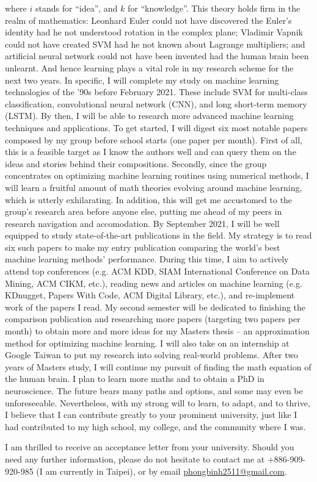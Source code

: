\documentclass[letterpaper,12pt]{article}
\begin{document}
where \(i\) stands for ``idea'', and \(k\) for ``knowledge''. This theory holds firm in the realm of mathematics: Leonhard Euler could not have discovered the Euler's identity had he not understood rotation in the complex plane; Vladimir Vapnik could not have created SVM had he not known about Lagrange multipliers; and artificial neural network could not have been invented had the human brain been unlearnt. And hence learning plays a vital role in my research scheme for the next two years. In specific, I will complete my study on machine learning technologies of the '90s before February 2021. These include SVM for multi-class classification, convolutional neural network (CNN), and long short-term memory (LSTM). By then, I will be able to research more advanced machine learning techniques and applications. To get started, I will digest six most notable papers composed by my group before school starts (one paper per month). First of all, this is a feasible target as I know the authors well and can query them on the ideas and stories behind their compositions. Secondly, since the group concentrates on optimizing machine learning routines using numerical methods, I will learn a fruitful amount of math theories evolving around machine learning, which is utterly exhilarating. In addition, this will get me accustomed to the group’s research area before anyone else, putting me ahead of my peers in research navigation and accomodation. By September 2021, I will be well equipped to study state-of-the-art publications in the field. My strategy is to read six such papers to make my entry publication comparing the world's best machine learning methods' performance. During this time, I aim to actively attend top conferences (e.g. ACM KDD, SIAM International Conference on Data Mining, ACM CIKM, etc.), reading news and articles on machine learning (e.g. KDnugget, Papers With Code, ACM Digital Library, etc.), and re-implement work of the papers I read. My second semester will be dedicated to finishing the comparison publication and researching more papers (targeting two papers per month) to obtain more and more ideas for my Masters thesis -- an approximation method for optimizing machine learning. I will also take on an internship at Google Taiwan to put my research into solving real-world problems. After two years of Masters study, I will continue my pursuit of finding the math equation of the human brain. I plan to learn more maths and to obtain a PhD in neuroscience. The future bears many paths and options, and some may even be unforeseeable. Nevertheless, with my strong will to learn, to adapt, and to thrive, I believe that I can contribute greatly to your prominent university, just like I had contributed to my high school, my college, and the community where I was.

I am thrilled to receive an acceptance letter from your university. Should you need any further information, please do not hesitate to contact me at +886-909-920-985 (I am currently in Taipei), or by email \href{mailto:phongbinh2511@gmail.com}{phongbinh2511@gmail.com}.
\end{document}
